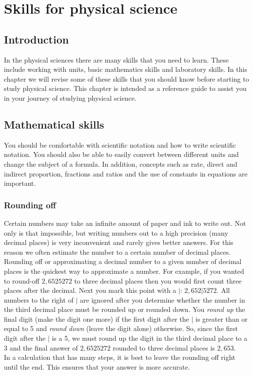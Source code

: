          \chapter{Skills for physical science}
    \setcounter{figure}{1}\setcounter{subfigure}{1}\label{m30853}
    \section{Introduction}
            \nopagebreak
In the physical sciences there are many skills that you need to learn. These include working with units, basic mathematics skills and laboratory skills. In this chapter we will revise some of these skills that you should know before starting to study physical science. This chapter is intended as a reference guide to assist you in your journey of studying physical science. 
\section{Mathematical skills}
You should be comfortable with scientific notation and how to write scientific notation. You should also be able to easily convert between different units and change the subject of a formula. In addition, concepts such as rate, direct and indirect proportion, fractions and ratios and the use of constants in equations are important. 
\subsection*{Rounding off}
Certain numbers may take an infinite amount of paper and ink to write out. Not only is that impossible, but writing numbers out to a high precision (many decimal places) is very inconvenient and rarely gives better answers. For this reason we often estimate the number to a certain number of decimal places. \\
Rounding off or approximating a decimal number to a given number of decimal places is the quickest way to approximate a number. For example, if you wanted to round-off $2,6525272$ to three decimal places then you would first count three places after the decimal. Next you mark this point with a $|$: $2,652|5272$. All numbers to the right of $|$ are ignored after you determine whether the number in the third decimal place must be rounded up or rounded down. You \textsl{round up} the final digit (make the digit one more) if the first digit after the $|$ is greater than or equal to 5 and \textsl{round down} (leave the digit alone) otherwise. So, since the first digit after the $|$ is a 5, we must round up the digit in the third decimal place to a 3 and the final answer of $2,6525272$ rounded to three decimal places is $2,653$. \\
In a calculation that has many steps, it is best to leave the rounding off right until the end. This ensures that your answer is more accurate.
